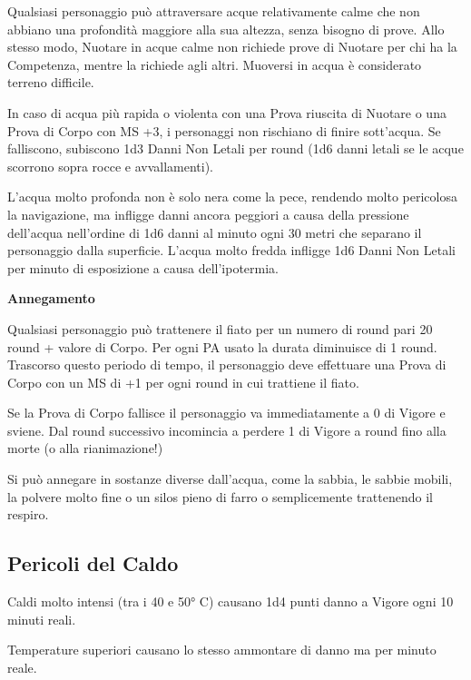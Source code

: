 \documentclass[12pt,a4paper,twoside,openany]{book}
\begin{document}
\begin{multicols}{2}
\label{pericoli-dellacqua}

Qualsiasi personaggio può attraversare acque relativamente calme che non abbiano una profondità maggiore alla sua altezza, senza bisogno di prove. Allo stesso modo, Nuotare in acque calme non richiede prove di Nuotare per chi ha la Competenza, mentre la richiede agli altri. Muoversi in acqua è considerato terreno difficile.

In caso di acqua più rapida o violenta con una Prova riuscita di Nuotare o una Prova di Corpo con MS +3, i personaggi non rischiano di finire sott'acqua. Se falliscono, subiscono 1d3 Danni Non Letali per round (1d6 danni letali se le acque scorrono sopra rocce e avvallamenti).

L'acqua molto profonda non è solo nera come la pece, rendendo molto pericolosa la navigazione, ma infligge danni ancora peggiori a causa della pressione dell'acqua nell'ordine di 1d6 danni al minuto ogni 30 metri che separano il personaggio dalla superficie. L'acqua molto fredda infligge 1d6 Danni Non Letali per minuto di esposizione a causa dell'ipotermia.

\textbf{Annegamento}\hypertarget{trattenereilfiato}{}

Qualsiasi personaggio può trattenere il fiato per un numero di round pari 20 round + valore di Corpo. Per ogni PA usato la durata diminuisce di 1 round. Trascorso questo periodo di tempo, il personaggio deve effettuare una Prova di Corpo con un MS di +1 per ogni round in cui trattiene il fiato.

Se la Prova di Corpo fallisce il personaggio va immediatamente a 0 di Vigore e sviene. Dal round successivo incomincia a perdere 1 di Vigore a round fino alla morte (o alla rianimazione!)

Si può annegare in sostanze diverse dall'acqua, come la sabbia, le sabbie mobili, la polvere molto fine o un silos pieno di farro o semplicemente trattenendo il respiro.

\subsection{Pericoli del Caldo}

\label{pericoli-del-caldo}

Caldi molto intensi (tra i 40 e 50° C) causano 1d4 punti danno a Vigore ogni 10 minuti reali.

Temperature superiori causano lo stesso ammontare di danno ma per minuto reale.


\end{multicols}
\end{document}
